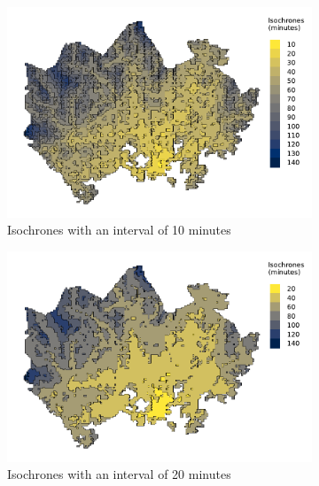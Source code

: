 \begin{figure}[H]
	\centering
	\begin{subfigure}[b]{0.5\textwidth}
		\centering
		\includegraphics[width=\textwidth]{visual/figures/ttm/isochrone_interval_10.pdf}
		\caption{Isochrones with an interval of 10 minutes}
		\label{fig:interval 10}
	\end{subfigure}%
	\hfill
	\begin{subfigure}[b]{0.5\textwidth}
		\centering
		\includegraphics[width=\textwidth]{visual/figures/ttm/isochrone_interval_20.pdf}
		\caption{Isochrones with an interval of 20 minutes}
		\label{fig:interval 20}
	\end{subfigure}%
	\hfill
	\begin{subfigure}[b]{0.5\textwidth}
		\centering

\end{subfigure}
\end{figure}
